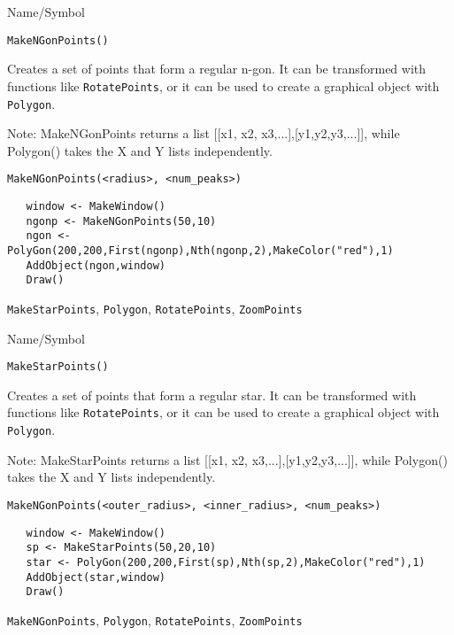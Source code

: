 \rl

\begin{desc}{Name/Symbol}
\item[Name/Symbol]	\verb+MakeNGonPoints()+

\item[Description] 
Creates a set of points that form a regular n-gon.  It can be
transformed with functions like \verb+RotatePoints+, or it can be 
used to create a graphical object with \verb+Polygon+.

Note: MakeNGonPoints returns a list [[x1, x2, x3,...],[y1,y2,y3,...]],
while Polygon() takes the X and Y lists independently.


\item[Usage]
\begin{verbatim}
MakeNGonPoints(<radius>, <num_peaks>)
\end{verbatim}

\item[Example]	
\begin{verbatim}
   window <- MakeWindow()
   ngonp <- MakeNGonPoints(50,10)
   ngon <- PolyGon(200,200,First(ngonp),Nth(ngonp,2),MakeColor("red"),1)
   AddObject(ngon,window)
   Draw()
\end{verbatim}

\item[See Also]	
\verb+MakeStarPoints+, \verb+Polygon+, \verb+RotatePoints+, \verb+ZoomPoints+
\end{desc}

\rl


\begin{desc}{Name/Symbol}
\item[Name/Symbol]	\verb+MakeStarPoints()+

\item[Description] 
Creates a set of points that form a regular star.  It can be
transformed with functions like \verb+RotatePoints+, or it can be 
used to create a graphical object with \verb+Polygon+.

Note: MakeStarPoints returns a list [[x1, x2, x3,...],[y1,y2,y3,...]],
while Polygon() takes the X and Y lists independently.

\item[Usage]
\begin{verbatim}
MakeNGonPoints(<outer_radius>, <inner_radius>, <num_peaks>)
\end{verbatim}

\item[Example]	
\begin{verbatim}
   window <- MakeWindow()
   sp <- MakeStarPoints(50,20,10)
   star <- PolyGon(200,200,First(sp),Nth(sp,2),MakeColor("red"),1)
   AddObject(star,window)
   Draw()
\end{verbatim}

\item[See Also]	
\verb+MakeNGonPoints+, \verb+Polygon+, \verb+RotatePoints+, \verb+ZoomPoints+
\end{desc}

